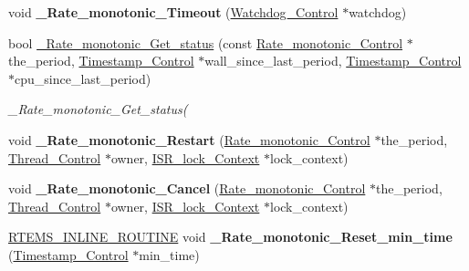 \begin{DoxyCompactItemize}
\item 
\mbox{\label{group__ClassicRateMonImpl_gaf57f665d68876281d6798e972a816665}} 
void {\bfseries \+\_\+\+Rate\+\_\+monotonic\+\_\+\+Timeout} (\mbox{\hyperlink{structWatchdog__Control}{Watchdog\+\_\+\+Control}} $\ast$watchdog)
\item 
bool \mbox{\hyperlink{group__ClassicRateMonImpl_ga086aaf1f3544bd976426c77cb2880561}{\+\_\+\+Rate\+\_\+monotonic\+\_\+\+Get\+\_\+status}} (const \mbox{\hyperlink{structRate__monotonic__Control}{Rate\+\_\+monotonic\+\_\+\+Control}} $\ast$the\+\_\+period, \mbox{\hyperlink{group__SuperCoreTimeStamp_ga8508036506d5211c98844c88045e2410}{Timestamp\+\_\+\+Control}} $\ast$wall\+\_\+since\+\_\+last\+\_\+period, \mbox{\hyperlink{group__SuperCoreTimeStamp_ga8508036506d5211c98844c88045e2410}{Timestamp\+\_\+\+Control}} $\ast$cpu\+\_\+since\+\_\+last\+\_\+period)
\begin{DoxyCompactList}\small\item\em \+\_\+\+Rate\+\_\+monotonic\+\_\+\+Get\+\_\+status( \end{DoxyCompactList}\item 
\mbox{\label{group__ClassicRateMonImpl_gac149608e7b5c9c8400ed8460734351d1}} 
void {\bfseries \+\_\+\+Rate\+\_\+monotonic\+\_\+\+Restart} (\mbox{\hyperlink{structRate__monotonic__Control}{Rate\+\_\+monotonic\+\_\+\+Control}} $\ast$the\+\_\+period, \mbox{\hyperlink{struct__Thread__Control}{Thread\+\_\+\+Control}} $\ast$owner, \mbox{\hyperlink{structISR__lock__Context}{I\+S\+R\+\_\+lock\+\_\+\+Context}} $\ast$lock\+\_\+context)
\item 
\mbox{\label{group__ClassicRateMonImpl_gab174ae30d1440637fecb41e22258f54f}} 
void {\bfseries \+\_\+\+Rate\+\_\+monotonic\+\_\+\+Cancel} (\mbox{\hyperlink{structRate__monotonic__Control}{Rate\+\_\+monotonic\+\_\+\+Control}} $\ast$the\+\_\+period, \mbox{\hyperlink{struct__Thread__Control}{Thread\+\_\+\+Control}} $\ast$owner, \mbox{\hyperlink{structISR__lock__Context}{I\+S\+R\+\_\+lock\+\_\+\+Context}} $\ast$lock\+\_\+context)
\item 
\mbox{\label{group__ClassicRateMonImpl_gad2ee630f4db943eacd1763ae84739b13}} 
\mbox{\hyperlink{group__RTEMSScoreBaseDefs_gac216239df231d5dbd15e3520b0b9313f}{R\+T\+E\+M\+S\+\_\+\+I\+N\+L\+I\+N\+E\+\_\+\+R\+O\+U\+T\+I\+NE}} void {\bfseries \+\_\+\+Rate\+\_\+monotonic\+\_\+\+Reset\+\_\+min\+\_\+time} (\mbox{\hyperlink{group__SuperCoreTimeStamp_ga8508036506d5211c98844c88045e2410}{Timestamp\+\_\+\+Control}} $\ast$min\+\_\+time)

\end{DoxyCompactItemize}
